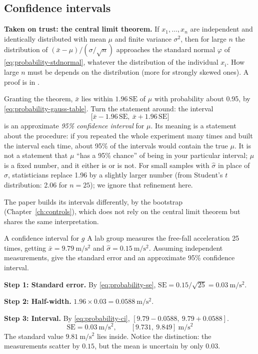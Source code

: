 \subsection{Confidence intervals}

\begin{beyond}
\textbf{Taken on trust: the central limit theorem.} If $x_1,\dots,x_n$ are independent and identically distributed with mean $\mu$ and finite variance $\sigma^2$, then for large $n$ the distribution of $(\bar x-\mu)/(\sigma/\sqrt n)$ approaches the standard normal $\varphi$ of \cref{eq:probability-stdnormal}, whatever the distribution of the individual $x_i$. How large $n$ must be depends on the distribution (more for strongly skewed ones). A proof is in \cite{rhb}.
\end{beyond}

Granting the theorem, $\bar x$ lies within $1.96\,\mathrm{SE}$ of $\mu$ with probability about 0.95, by \cref{eq:probability-gauss-table}. Turn the statement around: the interval
\begin{equation}
\bigl[\bar x-1.96\,\mathrm{SE},\ \bar x+1.96\,\mathrm{SE}\bigr]
\label{eq:probability-ci}
\end{equation}
is an approximate \emph{95\% confidence interval} for $\mu$. Its meaning is a statement about the procedure: if you repeated the whole experiment many times and built the interval each time, about 95\% of the intervals would contain the true $\mu$. It is not a statement that $\mu$ ``has a 95\% chance'' of being in your particular interval; $\mu$ is a fixed number, and it either is or is not. For small samples with $\hat\sigma$ in place of $\sigma$, statisticians replace 1.96 by a slightly larger number (from Student's $t$ distribution: 2.06 for $n=25$); we ignore that refinement here.

The paper builds its intervals differently, by the bootstrap (Chapter~\ref{ch:controls}), which does not rely on the central limit theorem but shares the same interpretation.

\begin{sample}{A confidence interval for $g$}
A lab group measures the free-fall acceleration 25 times, getting $\bar x=9.79~\mathrm{m/s^2}$ and $\hat\sigma=0.15~\mathrm{m/s^2}$. Assuming independent measurements, give the standard error and an approximate 95\% confidence interval.

\textbf{Step 1: Standard error.} By \cref{eq:probability-se}, $\mathrm{SE}=0.15/\sqrt{25}=0.03~\mathrm{m/s^2}$.

\textbf{Step 2: Half-width.} $1.96\times0.03=0.0588~\mathrm{m/s^2}$.

\textbf{Step 3: Interval.} By \cref{eq:probability-ci}, $[9.79-0.0588,\ 9.79+0.0588]$.
\[
\boxed{\mathrm{SE}=0.03~\mathrm{m/s^2},\qquad [9.731,\ 9.849]~\mathrm{m/s^2}}
\]
The standard value $9.81~\mathrm{m/s^2}$ lies inside. Notice the distinction: the measurements scatter by $0.15$, but the mean is uncertain by only $0.03$.
\end{sample}

